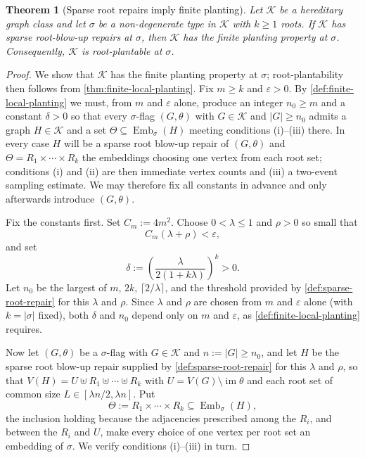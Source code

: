 \documentclass[11pt]{article}
\newtheorem{theorem}{Theorem}
\theoremstyle{definition}
\newcommand{\K}{\mathcal{K}}
\newcommand{\Emb}{\operatorname{Emb}}
\newcommand{\eps}{\varepsilon}
\begin{document}
\begin{theorem}[Sparse root repairs imply finite planting]\label{thm:sparse-repair-planting}
Let $\K$ be a hereditary graph class and let $\sigma$ be a non-degenerate type
in $\K$ with $k\ge1$ roots.  If $\K$ has sparse root-blow-up repairs
at $\sigma$, then $\K$ has the finite planting property at $\sigma$.
Consequently, $\K$ is root-plantable at $\sigma$.
\end{theorem}

\begin{proof}
We show that $\K$ has the finite planting property at $\sigma$;
root-plantability then follows from \cref{thm:finite-local-planting}.  Fix
$m\ge k$ and $\eps>0$.  By \cref{def:finite-local-planting} we must, from $m$ and
$\eps$ alone, produce an integer $n_0\ge m$ and a constant $\delta>0$ so that every
$\sigma$-flag $(G,\theta)$ with $G\in\K$ and $|G|\ge n_0$ admits a graph $H\in\K$
and a set $\Theta\subseteq\Emb_\sigma(H)$ meeting conditions (i)--(iii) there.  In
every case $H$ will be a sparse root blow-up repair of $(G,\theta)$ and
$\Theta=R_1\times\cdots\times R_k$ the embeddings choosing one vertex from each root
set; conditions (i) and (ii) are then immediate vertex counts and (iii) a two-event
sampling estimate.  We may therefore fix all constants in advance and only afterwards
introduce $(G,\theta)$.

Fix the constants first.  Set $C_m:=4m^2$.  Choose
$0<\lambda\le1$ and $\rho>0$ so small that
\[
  C_m(\lambda+\rho)<\eps ,
\]
and set
\[
  \delta:=\left(\frac{\lambda}{2(1+k\lambda)}\right)^k>0 .
\]
Let $n_0$ be the largest of $m$, $2k$, $\lceil2/\lambda\rceil$, and the threshold
provided by \cref{def:sparse-root-repair} for this $\lambda$ and $\rho$.  Since
$\lambda$ and $\rho$ are chosen from $m$ and $\eps$ alone (with $k=|\sigma|$ fixed),
both $\delta$ and $n_0$ depend only on $m$ and $\eps$, as
\cref{def:finite-local-planting} requires.

Now let $(G,\theta)$ be a $\sigma$-flag with $G\in\K$ and $n:=|G|\ge n_0$, and let
$H$ be the sparse root blow-up repair supplied by \cref{def:sparse-root-repair} for
this $\lambda$ and $\rho$, so that $V(H)=U\uplus R_1\uplus\cdots\uplus R_k$ with
$U=V(G)\setminus\operatorname{im}\theta$ and each root set of common size
$L\in[\lambda n/2,\lambda n]$.  Put
\[
  \Theta:=R_1\times\cdots\times R_k\subseteq\Emb_\sigma(H),
\]
the inclusion holding because the adjacencies prescribed among the $R_i$, and between
the $R_i$ and $U$, make every choice of one vertex per root set an embedding of
$\sigma$.  We verify conditions (i)--(iii) in turn.


\end{proof}
\end{document}
